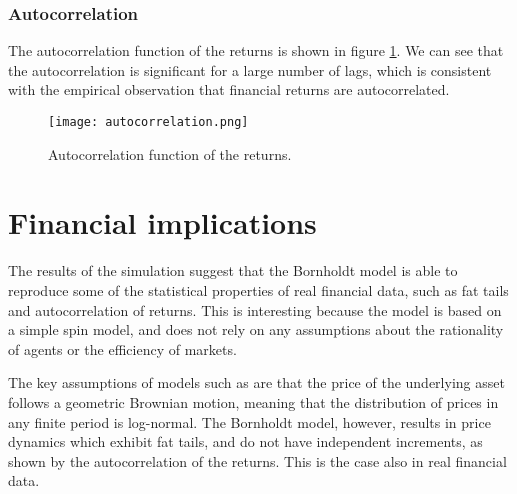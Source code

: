 \subsubsection{Autocorrelation}
The autocorrelation function of the returns is shown in figure \ref{fig:autocorrelation}. We can see that the autocorrelation is significant for a large number of lags, which is consistent with the empirical observation that financial returns are autocorrelated.

\begin{figure}[H]
    \centering
    \texttt{[image: autocorrelation.png]}
    \caption{Autocorrelation function of the returns.}
    \label{fig:autocorrelation}
\end{figure}

\section{Financial implications}
The results of the simulation suggest that the Bornholdt model is able to reproduce some of the statistical properties of real financial data, such as fat tails and autocorrelation of returns. This is interesting because the model is based on a simple spin model, and does not rely on any assumptions about the rationality of agents or the efficiency of markets.

The key assumptions of models such as \cite{black_scholes} are that the price of the underlying asset follows a geometric Brownian motion, meaning that the distribution of prices in any finite period is log-normal. The Bornholdt model, however, results in price dynamics which exhibit fat tails, and do not have independent increments, as shown by the autocorrelation of the returns. This is the case also in real financial data.